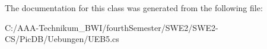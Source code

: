 The documentation for this class was generated from the following file\+:\begin{DoxyCompactItemize}
\item 
C\+:/\+A\+A\+A-\/\+Technikum\+\_\+\+B\+W\+I/fourth\+Semester/\+S\+W\+E2/\+S\+W\+E2-\/\+C\+S/\+Pic\+D\+B/\+Uebungen/U\+E\+B5.\+cs\end{DoxyCompactItemize}
